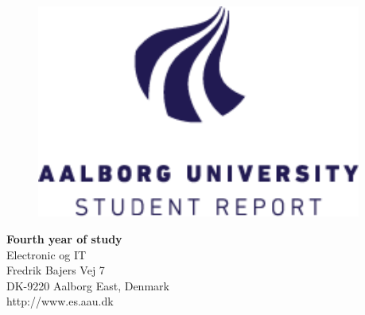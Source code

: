 {}
\thispagestyle{empty}

\begin{minipage}[t]{0.48\textwidth}
\vspace*{-25pt}			%

\begin{figure}[H] 
\includegraphics[width=0.95\textwidth]{report/introduction/aau_logo1}
\end{figure} 
\end{minipage}
\hfill
\begin{minipage}[t]{0.48\textwidth}
{\small 
\textbf{Fourth year of study}  \\
Electronic og IT \\
Fredrik Bajers Vej 7 \\
DK-9220 Aalborg East, Denmark\\
http://www.es.aau.dk}
\end{minipage}


\vspace*{1cm}

